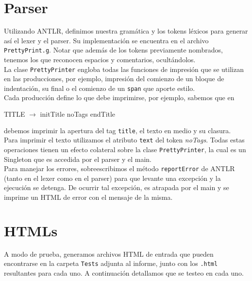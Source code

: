 \documentclass[11pt, a4paper, spanish]{article}
\newenvironment{xlist}[1]{%
	\begin{list}{}{%
		\settowidth{\labelwidth}{#1}
		\setlength{\labelsep}{0.5cm}
		\setlength{\leftmargin}{\labelwidth}
		\addtolength{\leftmargin}{\labelsep}
		\setlength{\rightmargin}{0pt}
		\setlength{\parsep}{0.5ex plus0.2ex minus0.1ex}
		\setlength{\itemsep}{0ex plus0.2ex}
		}
	}
{\end{list}}%
\begin{document}
\section{Parser}
\indent Utilizando ANTLR, definimos nuestra gram\'atica y los tokens l\'exicos para generar as\'i el lexer y el parser. Su implementaci\'on se encuentra en el archivo \texttt{PrettyPrint.g}. Notar que adem\'as de los tokens previamente nombrados, tenemos los que reconocen espacios y comentarios, ocult\'andolos.\\
\indent La clase \texttt{PrettyPrinter} engloba todas las funciones de impresi\'on que se utilizan en las producciones, por ejemplo, impresi\'on del comienzo de un bloque de indentaci\'on, su final o el comienzo de un \texttt{span} que aporte estilo. \\
\indent Cada producci\'on define lo que debe imprimirse, por ejemplo, sabemos que en 
	 \begin{xlist}{MORE\_SCRIPTS $\longrightarrow$}
	 \item[TITLE $\longrightarrow$] initTitle noTags endTitle
	 \end{xlist}
\indent debemos imprimir la apertura del tag \texttt{title}, el texto en medio y su clasura. \\
\indent Para imprimir el texto utilizamos el atributo \texttt{text} del token \textit{noTags}. Todas estas operaciones tienen un efecto colateral sobre la clase \texttt{PrettyPrinter}, la cual es un Singleton que es accedida por el parser y el main.\\
\indent Para manejar los errores, sobreescribimos el m\'etodo \texttt{reportError} de ANTLR (tanto en el lexer como en el parser) para que levante una excepci\'on y la ejecuci\'on se detenga. De ocurrir tal excepci\'on, es atrapada por el main y se imprime un HTML de error con el mensaje de la misma. 
\section{HTMLs}
\indent A modo de prueba, generamos archivos HTML de entrada que pueden encontrarse en la carpeta \texttt{Tests} adjunta al informe, junto con los \texttt{.html} resultantes para cada uno. A continuaci\'on detallamos que se testeo en cada uno.
\end{document}
